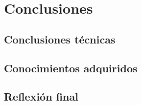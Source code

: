 \chapter{Conclusiones}
\label{chapter:conclusiones}


\section{Conclusiones técnicas}

\section{Conocimientos adquiridos}

\section{Reflexión final}